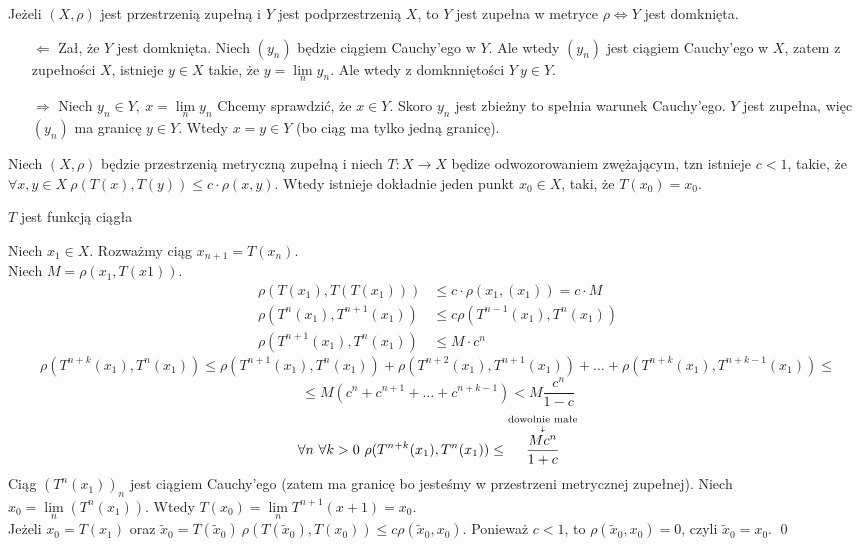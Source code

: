 \begin{tw} Jeżeli $(X,\rho)$ jest przestrzenią zupełną i $Y$ jest podprzestrzenią $X$, to $Y$ jest 
    zupełna w metryce $\rho \Leftrightarrow Y$ jest domknięta.
\end{tw}
\begin{dd} \hfill 
    \begin{itemize} 
        \item[$\Leftarrow$] Zał, że $Y$ jest domknięta. Niech $(y_n)$ będzie ciągiem Cauchy'ego w $Y$. 
            Ale wtedy $(y_n)$ jest ciągiem Cauchy'ego w $X$, zatem z zupełności $X$, istnieje $y \in X$ takie, że
            $ y= \lim\limits_n y_n$. Ale wtedy z domknniętości $Y \ y \in Y$.
        \item[$\Rightarrow$] Niech $y_n \in Y, \ x = \lim\limits_n y_n$ Chcemy sprawdzić, że 
            $x \in Y$. Skoro $y_n$ jest zbieżny to spełnia warunek Cauchy'ego. $Y$ jest zupełna, więc $(y_n)$
            ma granicę $y \in Y$. Wtedy $x = y \in Y$ (bo ciąg ma tylko jedną granicę).
    \end{itemize} 
\end{dd} 
\begin{tw} Niech $(X,\rho)$ będzie przestrzenią metryczną zupełną 
    i niech $T: X \to X$ będize odwozorowaniem zwężającym, tzn istnieje $c < 1$, takie, że 
    $\forall x,y \in X \ \rho( T (x), T (y)) \le c \cdot \rho(x,y)$. Wtedy istnieje dokładnie 
    jeden punkt $x_0 \in X$, taki, że $ T (x_0) = x_0$.
\end{tw} 
\begin{uw} $T$ jest funkcją ciągła \end{uw} 
\begin{dd} 
    Niech $x_1 \in X$. Rozważmy ciąg $x_{n+1} =  T (x_n)$. \\ 
    Niech $M = \rho(x_1, T (x1)).$
    \begin{align*}
        \rho ( T (x_1), T( T (x_1))) &\le c \cdot \rho(x_1, (x_1)) = c \cdot M \\ 
        \rho ( T ^n (x_1), T ^ {n+1}(x_1)) &\le c \rho( T^{n-1} (x_1), T^n (x_1)) \\
        \rho( T ^ {n+1}(x_1), T ^ n (x_1)) &\le M \cdot c^n 
    \end{align*} 
    \[
        \rho( T^{n+k} (x_1), T^n (x_1)) \le \rho ( T ^{n+1} (x_1), T^n(x_1)) + 
    \rho ( T^{n+2}(x_1), T^{n+1}(x_1)) + \ldots + \rho( T^{n+k}(x_1), T^{n+k-1}(x_1)) \le \]
    \[\le M(c^n + c^{n+1} + \ldots + c^{n+k-1}) < M \frac{c^n}{1-c} \]
    \[ \forall n \ \forall k > 0 \ \rho( T^{n+k}(x_1), T ^n(x_1)) \le 
    \overscript{\frac{M c^n}{1+c}}{\downarrow}{\text{dowolnie małe}} \]
    Ciąg $( T^n (x_1))_n$ jest ciągiem Cauchy'ego (zatem ma granicę bo jesteśmy w przestrzeni metrycznej zupełnej).
    Niech $x_0 = \lim\limits_n ( T^n (x_1))$. Wtedy $ T(x_0) = \lim\limits_n  T^{n+1}(x+1) = x_0$. \\ 
    Jeżeli $x_0 = T(x_1)$ oraz $\tilde x_0 = T(\tilde x_0) \ \rho(T(\tilde x_0),T(x_0)) \le c \rho(\tilde x_0,x_0)$. 
    Ponieważ $c < 1$, to $\rho(\tilde x_0,x_0) = 0$, czyli $\tilde x_0 = x_0$. \hfill \qed 
\end{dd} 

